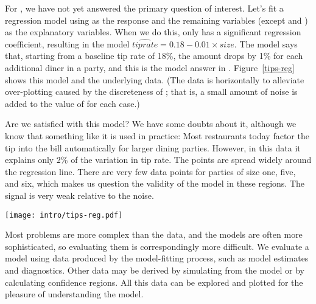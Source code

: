   For , we have not yet
answered the primary question of interest. Let's fit a regression
model using  as the response and the remaining variables
(except  and ) as the explanatory variables.  When
we do this, only  has a significant regression coefficient,
resulting in the model $\hat{tip rate} = 0.18 -0.01\times size$.  The
model says that, starting from a baseline tip rate of 18\%, the amount
drops by 1\% for each additional diner in a party, and this is the
model answer in .  Figure~\ref{tips-reg} shows this
model and the underlying data. (The data is 
horizontally to alleviate over-plotting caused by the discreteness of
; that is, a small amount of noise is added to the value
of  for each case.)

Are we satisfied with this model?  We have some doubts about it,
although we know that something like it is used in practice: Most
restaurants today factor the tip into the bill automatically for
larger dining parties.  However, in this data it explains only 2\% of
the variation in tip rate.  The points are spread widely around the
regression line.  There are very few data points for parties of size
one, five, and six, which makes us question the validity of the model
in these regions.  The signal is very weak relative to the noise.

\begin{figure*}[htp]
\centerline{\texttt{[image: intro/tips-reg.pdf]}}
\caption[Factors affecting tipping behavior]{Factors affecting
tipping behavior.  This scatterplot of  vs. 
shows the best model along with the data (jittered horizontally).
There is a lot of variation around the regression line, showing very
little signal relative to noise.  In addition there are very few data
points for parties of 1, 5, or 6 diners, so the model may not be valid
at these extremes.  }
\label{tips-reg}
\end{figure*}

Most problems are more complex than the  data, and the
models are often more sophisticated, so evaluating them is
correspondingly more difficult.  We evaluate a model using data
produced by the model-fitting process, such as model estimates and
diagnostics.  Other data may be derived by simulating from the model
or by calculating confidence regions.  All this data can be explored
and plotted for the pleasure of understanding the model.

